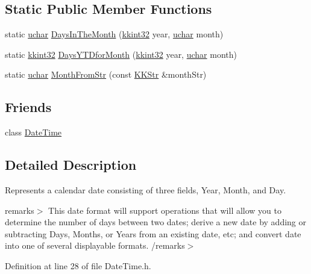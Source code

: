 \subsection*{Static Public Member Functions}
\begin{DoxyCompactItemize}
\item 
static \hyperlink{namespace_k_k_b_ace9969169bf514f9ee6185186949cdf7}{uchar} \hyperlink{class_k_k_b_1_1_date_type_a18f5bb113301526ccef710f5e29190a8}{Days\+In\+The\+Month} (\hyperlink{namespace_k_k_b_a8fa4952cc84fda1de4bec1fbdd8d5b1b}{kkint32} year, \hyperlink{namespace_k_k_b_ace9969169bf514f9ee6185186949cdf7}{uchar} month)
\item 
static \hyperlink{namespace_k_k_b_a8fa4952cc84fda1de4bec1fbdd8d5b1b}{kkint32} \hyperlink{class_k_k_b_1_1_date_type_aea4cdb6bdccbfad9e3ee811af7c96ce7}{Days\+Y\+T\+Dfor\+Month} (\hyperlink{namespace_k_k_b_a8fa4952cc84fda1de4bec1fbdd8d5b1b}{kkint32} year, \hyperlink{namespace_k_k_b_ace9969169bf514f9ee6185186949cdf7}{uchar} month)
\item 
static \hyperlink{namespace_k_k_b_ace9969169bf514f9ee6185186949cdf7}{uchar} \hyperlink{class_k_k_b_1_1_date_type_a4688c86e9f4518862fef8ea54e915913}{Month\+From\+Str} (const \hyperlink{class_k_k_b_1_1_k_k_str}{K\+K\+Str} \&month\+Str)
\end{DoxyCompactItemize}
\subsection*{Friends}
\begin{DoxyCompactItemize}
\item 
class \hyperlink{class_k_k_b_1_1_date_type_ae3d4a8787eced68c65a23f5906c11add}{Date\+Time}
\end{DoxyCompactItemize}


\subsection{Detailed Description}
Represents a calendar date consisting of three fields, Year, Month, and Day. 

remarks$>$ This date format will support operations that will allow you to determine the number of days between two dates; derive a new date by adding or subtracting Days, Months, or Years from an existing date, etc; and convert date into one of several displayable formats. /remarks$>$ 

Definition at line 28 of file Date\+Time.\+h.



